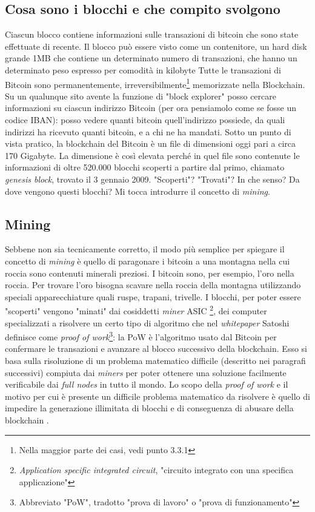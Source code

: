 \documentclass {article}
\begin{document}
\subsection {Cosa sono i blocchi e che compito svolgono}

Ciascun blocco contiene informazioni sulle transazioni di bitcoin che sono state effettuate di recente.
Il blocco può essere visto come un contenitore, un hard disk grande 1MB che contiene un determinato numero di transazioni, che hanno un determinato peso espresso per comodità in kilobyte
Tutte le transazioni di Bitcoin sono permanentemente, irreversibilmente\footnote{Nella maggior parte dei casi, vedi punto 3.3.1} memorizzate nella Blockchain.
Su un qualunque sito avente la funzione di "block explorer" posso cercare informazioni su ciascun indirizzo Bitcoin (per ora pensiamolo come se fosse un codice IBAN): posso vedere quanti bitcoin quell'indirizzo possiede, da quali indirizzi ha ricevuto quanti bitcoin, e a chi ne ha mandati.
Sotto un punto di vista pratico, la blockchain del Bitcoin è un file di dimensioni oggi pari a circa 170 Gigabyte.
La dimensione è così elevata perché in quel file sono contenute le informazioni di oltre 520.000 blocchi scoperti a partire dal primo, chiamato \textit{genesis block}, trovato il 3 gennaio 2009.
"Scoperti"? "Trovati"? In che senso? Da dove vengono questi blocchi? Mi tocca introdurre il concetto di \textit{mining}.


\subsection {Mining}


Sebbene non sia tecnicamente corretto, il modo più semplice per spiegare il concetto di \textit{mining} è quello di paragonare i bitcoin a una montagna nella cui roccia sono contenuti minerali preziosi.
I bitcoin sono, per esempio, l'oro nella roccia.
Per trovare l'oro bisogna scavare nella roccia della montagna utilizzando speciali apparecchiature quali ruspe, trapani, trivelle.
I blocchi, per poter essere "scoperti" vengono "minati" dai cosiddetti \textit{miner} ASIC \footnote{\textit{Application specific integrated circuit}, "circuito integrato con una specifica applicazione"}, dei computer specializzati a risolvere un certo tipo di algoritmo che nel \textit{whitepaper} Satoshi definisce come \textit{proof of work}\footnote{Abbreviato "PoW", tradotto "prova di lavoro" o "prova di funzionamento"}: la PoW è l'algoritmo usato dal Bitcoin per confermare le transazioni e avanzare al blocco successivo della blockchain.
Esso si basa sulla risoluzione di un problema matematico difficile (descritto nei paragrafi successivi) compiuta dai \textit{miners} per poter ottenere una soluzione facilmente verificabile dai \textit{full nodes} in tutto il mondo.
Lo scopo della \textit{proof of work} e il motivo per cui è presente un difficile problema matematico da risolvere è quello di impedire la generazione illimitata di blocchi e di conseguenza di abusare della blockchain .
\end{document}
